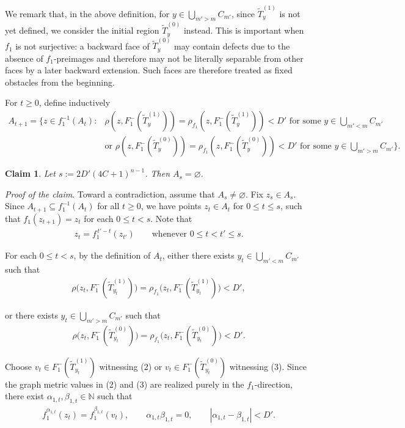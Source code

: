 \documentclass[11pt, reqno, a4paper]{amsart}
\theoremstyle{definition}
\theoremstyle{plain}
\newtheorem{claim}{Claim}
\begin{document}
We remark that, in the above definition, for
$y\in\bigcup_{m'>m}C_{m'}$, since $\widetilde T_y^{(1)}$ is not yet defined, we consider the initial region
$\widetilde T_y^{(0)}$ instead. This is important when $f_1$ is not surjective: a backward
face of $\widetilde T_y^{(0)}$ may contain defects due to the absence of $f_1$-preimages
and therefore may not be literally separable from other faces by a later backward extension. Such faces
are therefore treated as fixed obstacles from the beginning.

For $t\ge0$, define inductively 
$$
\begin{aligned}
    A_{t+1}=\Big\{z\in f_1^{-1}(A_t)\colon  &\rho(z, F_1^-(\widetilde T_y^{(1)}))=
\rho_{f_1}(z, F_1^-(\widetilde T_y^{(1)}))<D' \text{ for some } y \in \bigcup_{m'<m}C_{m'} \\
&\mbox{or } \rho(z, F_1^-(\widetilde T_y^{(0)}))=
\rho_{f_1}(z, F_1^-(\widetilde T_y^{(0)}))<D' \text{ for some } y \in \bigcup_{m'>m}C_{m'}\Big\}.
\end{aligned}
$$

\begin{claim}
\label{counting}
Let $s:=2D'(4C+1)^{n-1}$. Then
$A_s=\varnothing$.
\end{claim}

\noindent \emph{Proof of the claim}. 
Toward a contradiction, assume that $A_s\neq\varnothing$. Fix
$z_s\in A_s$. Since $A_{t+1}\subseteq f_1^{-1}(A_t)$ for all $t\ge 0$, we have points $z_t\in A_t$ for $0\le t\le s$, such that
$f_1(z_{t+1})=z_t$ for each $0\le t<s$.
Note that 
\begin{align}
z_t=f_1^{\,t'-t}(z_{t'})
\qquad\text{whenever }0\le t<t'\le s.
\tag{1}
\end{align}

For each $0\le t<s$, by the definition of $A_t$, either there exists
$y_t\in \bigcup_{m'<m}C_{m'}$
such that
\begin{align}
   \rho\bigl(z_t,F_1^-(\widetilde T_{y_t}^{(1)})\bigr)
=
\rho_{f_1}\bigl(z_t,F_1^-(\widetilde T_{y_t}^{(1)})\bigr)<D',
\tag{2} 
\end{align}

or there exists
$y_t\in \bigcup_{m'>m}C_{m'}$
such that
\begin{align}
    \rho\bigl(z_t,F_1^-(\widetilde T_{y_t}^{(0)})\bigr)
=
\rho_{f_1}\bigl(z_t,F_1^-(\widetilde T_{y_t}^{(0)})\bigr)<D'.
\tag{3}
\end{align}

Choose
$v_t\in F_1^-(\widetilde T_{y_t}^{(1)})$
witnessing (2) or $v_t\in F_1^-(\widetilde T_{y_t}^{(0)})$ witnessing (3). Since the graph metric values in (2) and (3) are realized purely
in the $f_1$-direction, there exist
$\alpha_{1,t}, \beta_{1,t}\in\mathbb N$
such that
\begin{align}
    f_1^{\alpha_{1,t}}(z_t)=f_1^{\beta_{1,t}}(v_t),
\qquad
\alpha_{1,t}\beta_{1,t}=0,
\qquad
|\alpha_{1,t}-\beta_{1,t}|<D'.
\tag{4}
\end{align}
\end{document}
